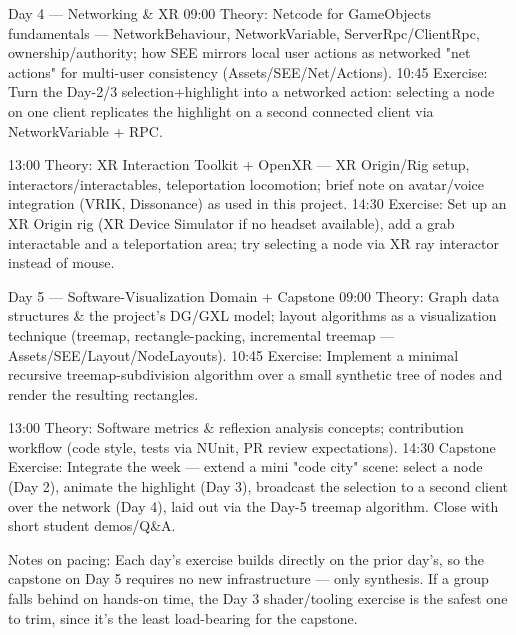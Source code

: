 Day 4 — Networking & XR
09:00 Theory: Netcode for GameObjects fundamentals — NetworkBehaviour, NetworkVariable, ServerRpc/ClientRpc, ownership/authority; how SEE mirrors local user actions as networked "net actions" for multi-user consistency (Assets/SEE/Net/Actions).
10:45 Exercise: Turn the Day-2/3 selection+highlight into a networked action: selecting a node on one client replicates the highlight on a second connected client via NetworkVariable + RPC.

13:00 Theory: XR Interaction Toolkit + OpenXR — XR Origin/Rig setup, interactors/interactables, teleportation locomotion; brief note on avatar/voice integration (VRIK, Dissonance) as used in this project.
14:30 Exercise: Set up an XR Origin rig (XR Device Simulator if no headset available), add a grab interactable and a teleportation area; try selecting a node via XR ray interactor instead of mouse.

Day 5 — Software-Visualization Domain + Capstone
09:00 Theory: Graph data structures & the project's DG/GXL model; layout algorithms as a visualization technique (treemap, rectangle-packing, incremental treemap — Assets/SEE/Layout/NodeLayouts).
10:45 Exercise: Implement a minimal recursive treemap-subdivision algorithm over a small synthetic tree of nodes and render the resulting rectangles.

13:00 Theory: Software metrics & reflexion analysis concepts; contribution workflow (code style, tests via NUnit, PR review expectations).
14:30 Capstone Exercise: Integrate the week — extend a mini "code city" scene: select a node (Day 2), animate the highlight (Day 3), broadcast the selection to a second client over the network (Day 4), laid out via the Day-5 treemap algorithm. Close with short student demos/Q&A.

Notes on pacing: Each day's exercise builds directly on the prior day's, so the capstone on Day 5 requires no new infrastructure — only synthesis. If a group falls behind on hands-on time, the Day 3 shader/tooling exercise is the safest one to trim, since it's the least load-bearing for the capstone.

